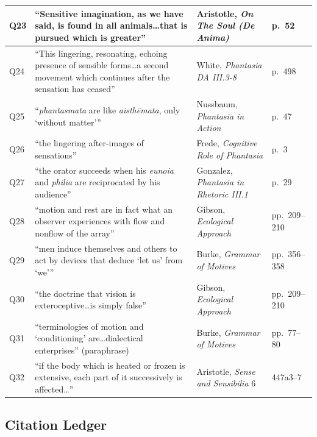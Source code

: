 \documentclass[12pt]{article}
\begin{document}
\begin{center}
\begin{tabular}{|l|l|l|l|}
\hline
Q23 & ``Sensitive imagination, as we have said, is found in all animals\dots that is pursued which is greater'' & Aristotle, \textit{On The Soul (De Anima)} & p.~52 \\
\hline
Q24 & ``This lingering, resonating, echoing presence of sensible forms\dots a second movement which continues after the sensation has ceased'' & White, \textit{Phantasia DA III.3-8} & p.~498 \\
\hline
Q25 & ``\textit{phantasmata} are like \textit{aisthēmata}, only `without matter''' & Nussbaum, \textit{Phantasia in Action} & p.~47 \\
\hline
Q26 & ``the lingering after-images of sensations'' & Frede, \textit{Cognitive Role of Phantasia} & p.~3 \\
\hline
Q27 & ``the orator succeeds when his \textit{eunoia} and \textit{philia} are reciprocated by his audience'' & Gonzalez, \textit{Phantasia in Rhetoric III.1} & p.~29 \\
\hline
Q28 & ``motion and rest are in fact what an observer experiences with flow and nonflow of the array'' & Gibson, \textit{Ecological Approach} & pp.~209--210 \\
\hline
Q29 & ``men induce themselves and others to act by devices that deduce `let us' from `we''' & Burke, \textit{Grammar of Motives} & pp.~356--358 \\
\hline
Q30 & ``the doctrine that vision is exteroceptive\dots is simply false'' & Gibson, \textit{Ecological Approach} & pp.~209--210 \\
\hline
Q31 & ``terminologies of motion and `conditioning' are\dots dialectical enterprises'' (paraphrase) & Burke, \textit{Grammar of Motives} & pp.~77--80 \\
\hline
Q32 & ``if the body which is heated or frozen is extensive, each part of it successively is affected\dots'' & Aristotle, \textit{Sense and Sensibilia} 6 & 447a3--7 \\
\hline
\end{tabular}
\end{center}

\subsection*{Citation Ledger}
\end{document}
